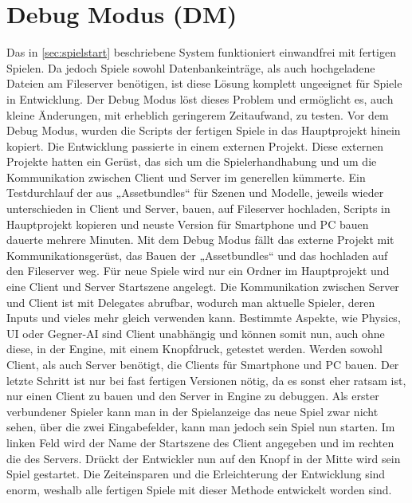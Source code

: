 \section{Debug Modus (DM)} \label{sec:debug-modus}
Das in \ref{sec:spielstart} beschriebene System funktioniert einwandfrei mit fertigen Spielen. Da jedoch Spiele sowohl Datenbankeinträge, als auch hochgeladene Dateien am Fileserver benötigen, ist diese Lösung komplett ungeeignet für Spiele in Entwicklung. Der Debug Modus löst dieses Problem und ermöglicht es, auch kleine Änderungen, mit erheblich geringerem Zeitaufwand, zu testen.
Vor dem Debug Modus, wurden die Scripts der fertigen Spiele in das Hauptprojekt hinein kopiert. Die Entwicklung passierte in einem externen Projekt. Diese externen Projekte hatten ein Gerüst, das sich um die Spielerhandhabung und um die Kommunikation zwischen Client und Server im generellen kümmerte. Ein Testdurchlauf der aus „Assetbundles“ für Szenen und Modelle, jeweils wieder unterschieden in Client und Server, bauen, auf Fileserver hochladen, Scripts in Hauptprojekt kopieren und neuste Version für Smartphone und PC bauen dauerte mehrere Minuten.
Mit dem Debug Modus fällt das externe Projekt mit Kommunikationsgerüst, das Bauen der „Assetbundles“ und das hochladen auf den Fileserver weg. Für neue Spiele wird nur ein Ordner im Hauptprojekt und eine Client und Server Startszene angelegt. Die Kommunikation zwischen Server und Client ist mit Delegates abrufbar, wodurch man aktuelle Spieler, deren Inputs und vieles mehr gleich verwenden kann. Bestimmte Aspekte, wie Physics, UI oder Gegner-AI sind Client unabhängig und können somit nun, auch ohne diese, in der Engine, mit einem Knopfdruck, getestet werden. Werden sowohl Client, als auch Server benötigt, die Clients für Smartphone und PC bauen. Der letzte Schritt ist nur bei fast fertigen Versionen nötig, da es sonst eher ratsam ist, nur einen Client zu bauen und den Server in Engine zu debuggen.
Als erster verbundener Spieler kann man in der Spielanzeige das neue Spiel zwar nicht sehen, über die zwei Eingabefelder, kann man jedoch sein Spiel nun starten. Im linken Feld wird der Name der Startszene des Client angegeben und im rechten die des Servers. Drückt der Entwickler nun auf den Knopf in der Mitte wird sein Spiel gestartet. Die Zeiteinsparen und die Erleichterung der Entwicklung sind enorm, weshalb alle fertigen Spiele mit dieser Methode entwickelt worden sind.
